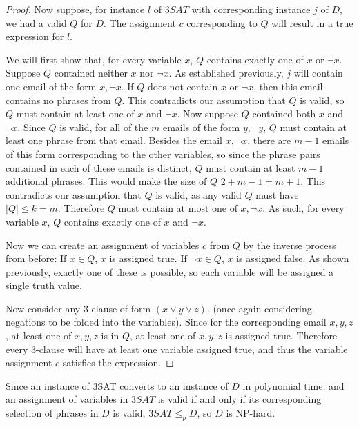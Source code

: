 \documentclass[11pt]{article}
\begin{document}
\begin{proof}
    Now suppose, for instance $l$ of $3SAT$ with corresponding instance $j$ of $D$, we had a valid $Q$ for $D$. The assignment $c$ corresponding to $Q$ will result in a true expression for $l$. 

    We will first show that, for every variable $x$, $Q$ contains exactly one of $x$ or $\lnot x$. Suppose $Q$ contained neither $x$ nor $\lnot x$. As established previously, $j$ will contain one email of the form $x, \lnot x$. If $Q$ does not contain $x$ or $\lnot x$, then this email contains no phrases from $Q$. This contradicts our assumption that $Q$ is valid, so $Q$ must contain at least one of $x$ and $\lnot x$. Now suppose $Q$ contained both $x$ and $\lnot x$. Since $Q$ is valid, for all of the $m$ emails of the form $y, \lnot y$, $Q$ must contain at least one phrase from that email. Besides the email $x, \lnot x$, there are $m-1$ emails of this form corresponding to the other variables, so since the phrase pairs contained in each of these emails is distinct, $Q$ must contain at least $m - 1$ additional phrases. This would make the size of $Q$ $2 + m-1 = m+1$. This contradicts our assumption that $Q$ is valid, as any valid $Q$ must have $|Q| \leq k = m$. Therefore $Q$ must contain at most one of $x, \lnot x$. As such, for every variable $x$, $Q$ contains exactly one of $x$ and $\lnot x$. 

    Now we can create an assignment of variables $c$ from $Q$ by the inverse process from before: If $x \in Q$, $x$ is assigned true. If $\lnot x \in Q$, $x$ is assigned false. As shown previously, exactly one of these is possible, so each variable will be assigned a single truth value. 

    Now consider any 3-clause of form $(x \lor y \lor z)$. (once again considering negations to be folded into the variables). Since for the corresponding email $x, y, z$, at least one of $x, y, z$ is in $Q$, at least one of $x, y, z$ is assigned true. Therefore every 3-clause will have at least one variable assigned true, and thus the variable assignment $c$ satisfies the expression. 

\end{proof}

Since an instance of 3SAT converts to an instance of $D$ in polynomial time, and an assignment of variables in $3SAT$ is valid if and only if its corresponding selection of phrases in $D$ is valid, $3SAT \leq_p D$, so $D$ is NP-hard. 

\section{}
\end{document}
